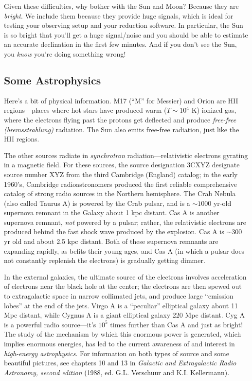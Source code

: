 \documentclass[11pt,preprint]{aastex}
\begin{document}
	Given these difficulties, why bother with the Sun and Moon?
Because they are {\it bright}. We include them because they provide huge
signals, which is ideal for testing your observing setup and your
reduction software.  In particular, the Sun is so bright that you'll get
a huge signal/noise and you should be able to estimate an accurate
declination in the first few minutes. And if you don't see the Sun, you
{\it know} you're doing something wrong!

\subsection{Some Astrophysics}

Here's a bit of physical information.  M17 (``M'' for Messier) and Orion
are HII regions---places where hot stars have produced warm ($T \sim
10^4$ K) ionized gas, where the electrons flying past the protons get
deflected and produce {\it free-free (bremsstrahlung)} radiation.  The
Sun also emits free-free radiation, just like the HII regions.

The other sources radiate in {\it synchrotron} radiation---relativistic
electrons gyrating in a magnetic field.  For these sources, the source
designation 3CXYZ designate source number XYZ from the third Cambridge
(England) catalog; in the early 1960's, Cambridge radioastronomers
produced the first reliable comprehensive catalog of strong radio
sources in the Northern hemisphere.  The Crab Nebula (also called Taurus
A) is powered by the Crab pulsar, and is a $\sim 1000$ yr-old supernova
remnant in the Galaxy about 1 kpc distant. Cas A is another supernova
remnant, {\it not} powered by a pulsar; rather, the relativistic
electrons are produced behind the fast shock wave produced by the
explosion.  Cas A is $\sim 300$ yr old and about 2.5 kpc distant.  Both
of these supernova remnants are expanding rapidly, as befits their young
ages, and Cas A (in which a pulsar does not constantly replenish the
electrons) is gradually getting dimmer.

In the external galaxies, the ultimate source of the
electrons involves acceleration of electrons near the black hole at the
center; the electrons are then spewed out to extragalactic space in
narrow collimated jets, and produce large ``emission lobes'' at the end
of the jets.  Virgo A is a ``peculiar''
elliptical galaxy about 11 Mpc distant, while Cygnus A is a giant
elliptical galaxy 220 Mpc distant.  Cyg A is a powerful radio
source---it's $10^5$ times further than Cas A and just as bright! The
study of the mechanism by which this enormous power is generated, which
implies enormous energies, has led to the current awareness of and
interest in {\it high-energy astrophysics}.
For information on both types of source and some beautiful
pictures, see chapters 10 and 13 in {\it Galactic and Extragalactic
Radio Astronomy, second edition} (1988, ed.  G.L.  Verschuur and K.I. 
Kellermann). 
\end{document}
